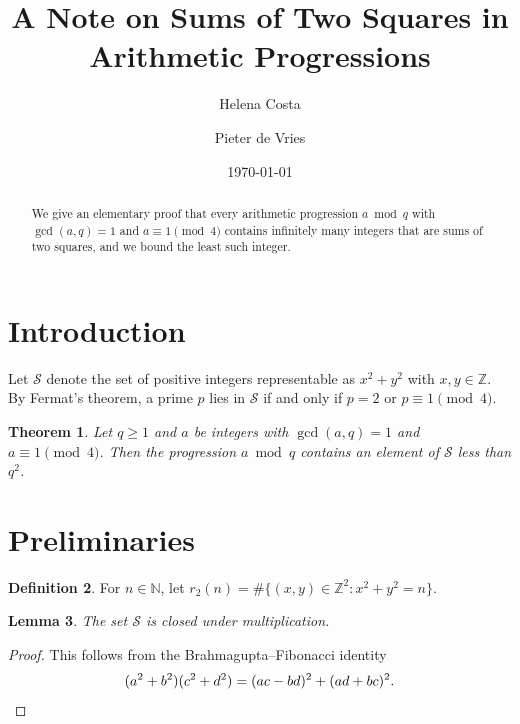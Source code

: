 \documentclass{amsart}
\newtheorem{theorem}{Theorem}[section]
\newtheorem{lemma}[theorem]{Lemma}
\theoremstyle{definition}
\newtheorem{definition}[theorem]{Definition}
\theoremstyle{remark}
\begin{document}
\title{A Note on Sums of Two Squares in Arithmetic Progressions}
\author{Helena Costa}
\address{Instituto de Matemática, Universidade Federal do Rio de Janeiro, Brazil}
\author{Pieter de Vries}
\address{Mathematical Institute, Leiden University, The Netherlands}
\date{\today}

\begin{abstract}
We give an elementary proof that every arithmetic progression $a \bmod q$ with
$\gcd(a,q)=1$ and $a\equiv 1 \pmod 4$ contains infinitely many integers that are sums of
two squares, and we bound the least such integer.
\end{abstract}

\maketitle

\section{Introduction}
Let $\mathcal{S}$ denote the set of positive integers representable as $x^2+y^2$ with
$x,y\in\mathbb{Z}$. By Fermat's theorem, a prime $p$ lies in $\mathcal{S}$ if and only if
$p=2$ or $p\equiv1\pmod 4$.

\begin{theorem}\label{thm:main}
Let $q\ge1$ and $a$ be integers with $\gcd(a,q)=1$ and $a\equiv1\pmod 4$. Then the
progression $a\bmod q$ contains an element of $\mathcal{S}$ less than $q^{2}$.
\end{theorem}

\section{Preliminaries}
\begin{definition}
For $n\in\mathbb{N}$, let $r_2(n) = \#\{(x,y)\in\mathbb{Z}^2 : x^2+y^2=n\}$.
\end{definition}

\begin{lemma}\label{lem:mult}
The set $\mathcal{S}$ is closed under multiplication.
\end{lemma}

\begin{proof}
This follows from the Brahmagupta--Fibonacci identity
\[
(a^2+b^2)(c^2+d^2) = (ac-bd)^2 + (ad+bc)^2. \qedhere
\]
\end{proof}
\end{document}
